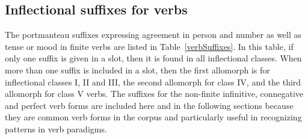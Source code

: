 \subsection{Inflectional suffixes for verbs}\label{inflectionalSuffVerbs}
The portmanteau suffixes expressing agreement in person and number as well as tense or mood in finite verbs are listed in Table~\vref{verbSuffixes}. 
In this table, if only one suffix is given in a slot, then it is found in all inflectional classes. When more than one suffix is included in a slot, then the first allomorph is for inflectional classes I, II and III, the second allomorph for class IV, and the third allomorph for class V verbs. 
The suffixes for the non-finite infinitive, connegative and perfect verb forms are included here and in the following sections because they are common verb forms in the corpus and particularly useful in recognizing patterns in verb paradigms. %
